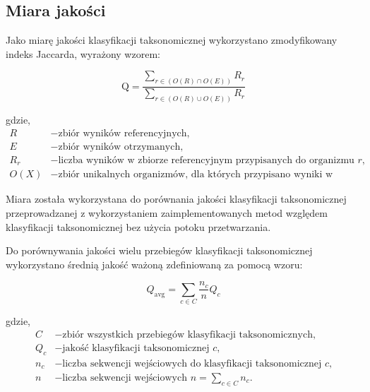     \subsection{Miara jakości}

        Jako miarę jakości klasyfikacji taksonomicznej wykorzystano zmodyfikowany indeks Jaccarda, wyrażony wzorem:

        \begin{equation}
            \text{Q} = \frac{
                \sum_{r \in (O(R) \cap O(E))} R_{r}
            }{
                \sum_{r \in (O(R) \cup O(E))} R_{r}
            }
            \label{Equation:Quality}
        \end{equation}

        gdzie,
        \begin{align*}
            R &- \text{zbiór wyników referencyjnych,} \\
            E &- \text{zbiór wyników otrzymanych,} \\
            R_{r} &- \text{liczba wyników w zbiorze referencyjnym przypisanych do organizmu $r$,} \\
            O(X) &- \text{zbiór unikalnych organizmów, dla których przypisano wyniki w zbiorze X. }
        \end{align*}

        Miara została wykorzystana do porównania jakości klasyfikacji taksonomicznej przeprowadzanej z wykorzystaniem zaimplementowanych metod względem klasyfikacji taksonomicznej bez użycia potoku przetwarzania.

        Do porównywania jakości wielu przebiegów klasyfikacji taksonomicznej wykorzystano średnią jakość ważoną zdefiniowaną za pomocą wzoru:

        \begin{equation}
            Q_{\text{avg}} = \sum_{c \in C} \frac{n_c}{n} Q_c
            \label{Equation:WeightedAverageQuality}
        \end{equation}

        gdzie,
        \begin{align*}
          C &- \text{zbiór wszystkich przebiegów klasyfikacji taksonomicznych,} \\
          Q_c &- \text{jakość klasyfikacji taksonomicznej $c$,} \\
          n_c &- \text{liczba sekwencji wejściowych do klasyfikacji taksonomicznej $c$,}\\
          n   &- \text{liczba sekwencji wejściowych $n = \sum_{c \in C} n_{c}.$}
        \end{align*}


